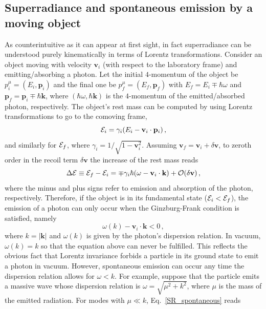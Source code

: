 \documentclass[11pt]{article}
\numberwithin{equation}{section} %
\begin{document}
\subsection{Superradiance and spontaneous emission by a moving object~\label{subsec:spontaneous}}
As counterintuitive as it can appear at first sight, in fact superradiance can be understood purely kinematically in terms of Lorentz transformations. Consider an object moving with velocity $\mathbf{v}_i$ (with respect to the laboratory frame) and emitting/absorbing a photon. Let the initial $4$-momentum of the object be $p^\mu_i=(E_i,\mathbf{p}_i)$ and the final one be $p^\mu_f=(E_f,\mathbf{p}_f)$ with $E_f=E_i\mp\hbar \omega$ and $\mathbf{p}_f=\mathbf{p}_i\mp\hbar \mathbf{k}$, where $(\hbar\omega,\hbar\mathbf{k})$ is the $4$-momentum of the emitted/absorbed photon, respectively. The object's rest mass can be computed by using Lorentz transformations to go to the comoving frame,
\begin{equation}
 {\cal E}_i=\gamma_i(E_i-\mathbf{v}_i\cdot\mathbf{p}_i)\,,
\end{equation}
and similarly for ${\cal E}_f$, where $\gamma_i=1/\sqrt{1-\mathbf{v}^2_i}$. Assuming $\mathbf{v}_f=\mathbf{v}_i+\delta\mathbf{v}$, to zeroth order in the recoil term $\delta\mathbf{v}$ the increase of the rest mass reads
\begin{equation}
 \Delta {\cal E}\equiv {\cal E}_f-{\cal E}_i=\mp\gamma_i\hbar(\omega-\mathbf{v}_i\cdot\mathbf{k})+{\cal O}(\delta\mathbf{v})\,, \label{deltaE}
\end{equation}
where the minus and plus signs refer to emission and absorption of the photon, respectively. Therefore, if the object is in its fundamental state (${\cal E}_i<{\cal E}_f$), the emission of a photon can only occur when the Ginzburg-Frank condition is satisfied, namely~\cite{Ginzburg:1945zz,Ginzburg:1947}
\begin{equation}
 \omega(k)-\mathbf{v}_i\cdot\mathbf{k}<0\,, \label{SR_spontaneous}
\end{equation}
where $k=|\mathbf{k}|$ and $\omega(k)$ is given by the photon's dispersion relation. In vacuum, $\omega(k)=k$ so that the equation above can never be fulfilled. This reflects the obvious fact that Lorentz invariance forbids a particle in its ground state to emit a photon in vacuum. However, spontaneous emission can occur any time the dispersion relation allows for $\omega<k$. For example, suppose that the particle emits a massive wave whose dispersion relation is $\omega=\sqrt{\mu^2+k^2}$, where $\mu$ is the mass of the emitted radiation. For modes with $\mu\ll k$, Eq.~\eqref{SR_spontaneous} reads
\end{document}

